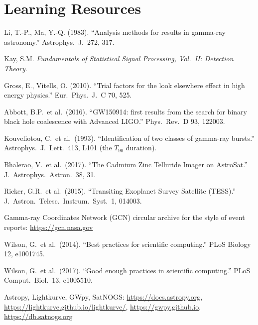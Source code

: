 \documentclass[11pt,a4paper]{article}
\begin{document}
\section*{Learning Resources}
\begin{resources}
  \item Li, T.-P., Ma, Y.-Q. (1983). ``Analysis methods for results in gamma-ray astronomy.'' Astrophys.\ J.\ 272, 317.
  \item Kay, S.M. \emph{Fundamentals of Statistical Signal Processing, Vol.~II: Detection Theory}.
  \item Gross, E., Vitells, O. (2010). ``Trial factors for the look elsewhere effect in high energy physics.'' Eur.\ Phys.\ J.\ C 70, 525.
  \item Abbott, B.P.\ et al.\ (2016). ``GW150914: first results from the search for binary black hole coalescence with Advanced LIGO.'' Phys.\ Rev.\ D 93, 122003.
\end{resources}
\begin{resources}
  \item Kouveliotou, C.\ et al.\ (1993). ``Identification of two classes of gamma-ray bursts.'' Astrophys.\ J.\ Lett.\ 413, L101 (the $T_{90}$ duration).
  \item Bhalerao, V.\ et al.\ (2017). ``The Cadmium Zinc Telluride Imager on AstroSat.'' J.\ Astrophys.\ Astron.\ 38, 31.
  \item Ricker, G.R.\ et al.\ (2015). ``Transiting Exoplanet Survey Satellite (TESS).'' J.\ Astron.\ Telesc.\ Instrum.\ Syst.\ 1, 014003.
  \item Gamma-ray Coordinates Network (GCN) circular archive for the style of event reports: \url{https://gcn.nasa.gov}
\end{resources}
\begin{resources}
  \item Wilson, G.\ et al.\ (2014). ``Best practices for scientific computing.'' PLoS Biology 12, e1001745.
  \item Wilson, G.\ et al.\ (2017). ``Good enough practices in scientific computing.'' PLoS Comput.\ Biol.\ 13, e1005510.
  \item Astropy, Lightkurve, GWpy, SatNOGS: \url{https://docs.astropy.org}, \url{https://lightkurve.github.io/lightkurve/}, \url{https://gwpy.github.io}, \url{https://db.satnogs.org}
\end{resources}

\evaluation
\end{document}
